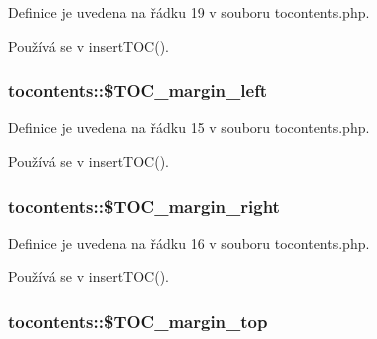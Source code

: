 Definice je uvedena na řádku 19 v souboru tocontents.\-php.



Používá se v insert\-T\-O\-C().

\hypertarget{classtocontents_a593bc1f34481babc3d7395d409f8b665}{
\subsubsection[{\$\-T\-O\-C\-\_\-margin\-\_\-left}]{\setlength{\rightskip}{0pt plus 5cm}tocontents\-::\$\-T\-O\-C\-\_\-margin\-\_\-left}}\label{classtocontents_a593bc1f34481babc3d7395d409f8b665}


Definice je uvedena na řádku 15 v souboru tocontents.\-php.



Používá se v insert\-T\-O\-C().

\hypertarget{classtocontents_a43884998e681e29be2be505fe1b3e7a4}{
\subsubsection[{\$\-T\-O\-C\-\_\-margin\-\_\-right}]{\setlength{\rightskip}{0pt plus 5cm}tocontents\-::\$\-T\-O\-C\-\_\-margin\-\_\-right}}\label{classtocontents_a43884998e681e29be2be505fe1b3e7a4}


Definice je uvedena na řádku 16 v souboru tocontents.\-php.



Používá se v insert\-T\-O\-C().

\hypertarget{classtocontents_ad31c869d2688731c3aad246aded2d761}{
\subsubsection[{\$\-T\-O\-C\-\_\-margin\-\_\-top}]{\setlength{\rightskip}{0pt plus 5cm}tocontents\-::\$\-T\-O\-C\-\_\-margin\-\_\-top}}\label{classtocontents_ad31c869d2688731c3aad246aded2d761}


